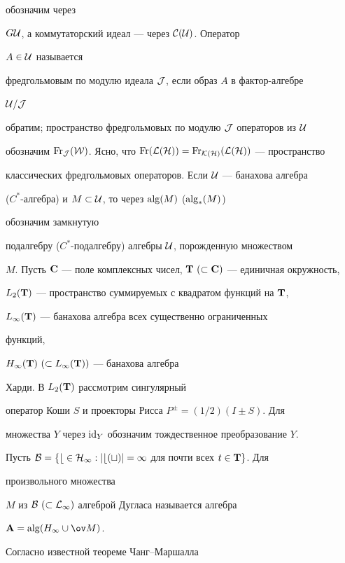 обозначим через 


$G\cal U$, а коммутаторский идеал --- через $\cal C(\cal U)$. Оператор 


$A\in\cal U$ называется 


фредгольмовым по модулю идеала $\cal J$, если образ $A$ в фактор-алгебре 


$\cal U/\cal J$ 


обратим; пространство фредгольмовых по модулю $\cal J$ операторов из $\cal 


U$ 


обозначим $\Fr_{\cal J}(\cal W)$. Ясно, что $\Fr(\cal L(\cal H))= \Fr_{\cal 


K(\cal H)}(\cal L(\cal H))$ --- пространство 


классических фредгольмовых операторов. Если $\cal U$ --- банахова алгебра 


($C^*$-алгебра) и $M\subset\cal U$, то через $\operatorname{alg}(M)$ ($\operatorname{alg}_*(M)$) 


обозначим замкнутую 


подалгебру ($C^*$-подалгебру) алгебры $\cal U$, порожденную множеством 


$M$. Пусть $\bold C$ --- поле комплексных чисел, $\bold T\ (\subset\bold 


C)$ --- единичная окружность, 


$L_2(\bold T)$ --- пространство суммируемых с квадратом функций на $\bold 


T$, 


$L_\infty(\bold T)$ --- банахова алгебра всех существенно ограниченных 


функций, 


$H_\infty(\bold T)\ (\subset L_\infty(\bold T))$ --- банахова алгебра 


Харди. В $L_2(\bold T)$ рассмотрим сингулярный 


оператор Коши $S$ и проекторы Рисса $P^\pm=(1/2)(I\pm S)$. Для 


множества $Y$ через $\operatorname{id}_Y$ обозначим тождественное преобразование $Y$. 


 


Пусть $\cal B=\{b\in H_\infty:|b(t)|=1$ для почти всех $t\in\bold T\}$. Для 


произвольного множества 


$M$ из $\cal B\ (\subset L_\infty)$ алгеброй Дугласа называется алгебра 


$\bold A=\alg(H_\infty\cup\ov M)$. 


Согласно известной теореме Чанг--Маршалла 


